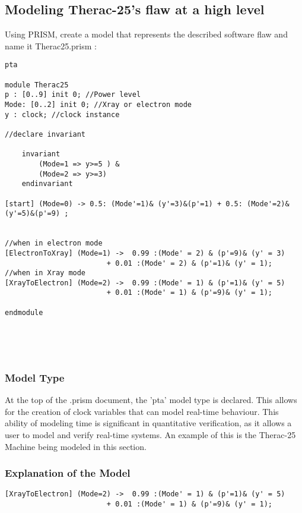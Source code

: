 \documentclass[a4paper]{article}
\begin{document}
\subsection{Modeling Therac-25's flaw at a high level}

Using PRISM, create a model that represents the described software flaw and name it Therac25.prism :

\begin{lstlisting}
pta

module Therac25
p : [0..9] init 0; //Power level
Mode: [0..2] init 0; //Xray or electron mode
y : clock; //clock instance

//declare invariant

    invariant
        (Mode=1 => y>=5 ) & 
        (Mode=2 => y>=3)
    endinvariant

[start] (Mode=0) -> 0.5: (Mode'=1)& (y'=3)&(p'=1) + 0.5: (Mode'=2)& (y'=5)&(p'=9) ;


//when in electron mode
[ElectronToXray] (Mode=1) ->  0.99 :(Mode' = 2) & (p'=9)& (y' = 3) 
					    + 0.01 :(Mode' = 2) & (p'=1)& (y' = 1);
//when in Xray mode
[XrayToElectron] (Mode=2) ->  0.99 :(Mode' = 1) & (p'=1)& (y' = 5)
					    + 0.01 :(Mode' = 1) & (p'=9)& (y' = 1);

endmodule





\end{lstlisting}

\subsubsection{Model Type}
At the top of the .prism document, the 'pta' model type is declared. This allows for the creation of clock variables that can model real-time behaviour. This ability of modeling time is significant in quantitative verification, as it allows a user to model and verify real-time systems. An example of this is the Therac-25 Machine being modeled in this section. 

\subsubsection{Explanation of the Model}

\begin{lstlisting}
[XrayToElectron] (Mode=2) ->  0.99 :(Mode' = 1) & (p'=1)& (y' = 5)
					    + 0.01 :(Mode' = 1) & (p'=9)& (y' = 1);

\end{lstlisting}
\end{document}
